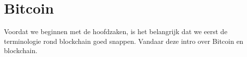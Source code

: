 \documentclass[fleqn,a4paper,12pt]{book}
\begin{document}


\inserttitlepage

\usechapterimagefalse



\pagestyle{empty} %
\tableofcontents %
\cleardoublepage %
\pagestyle{fancy} %


%









%
%
\chapter{Bitcoin}
Voordat we beginnen met de hoofdzaken, is het belangrijk dat we eerst de terminologie rond blockchain goed snappen. Vandaar deze intro over Bitcoin en blockchain.

\end{document}
